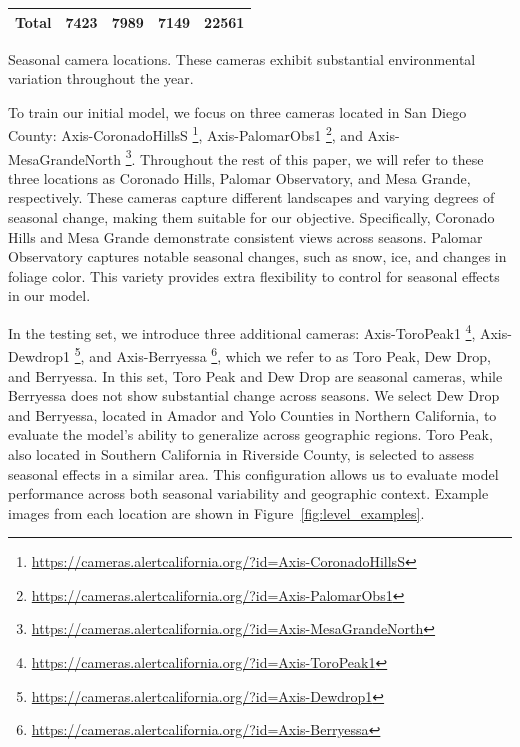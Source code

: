 \documentclass[remotesensing,article,submit,moreauthors]{Definitions/mdpi}
\begin{document}
\begin{table}[H]
\begin{threeparttable}
\begin{tabular}{@{}lrrrr@{}}
\midrule
\textbf{Total} & 7423 & 7989 & 7149 & 22561 \\
\bottomrule
\end{tabular}

\begin{tablenotes}
\footnotesize
\item[*]Seasonal camera locations. These cameras exhibit substantial environmental variation throughout the year.
\end{tablenotes}

\end{threeparttable}
\end{table}


To train our initial model, we focus on three cameras located in San Diego County: Axis-CoronadoHillsS \footnote{\url{https://cameras.alertcalifornia.org/?id=Axis-CoronadoHillsS}}, Axis-PalomarObs1 \footnote{\url{https://cameras.alertcalifornia.org/?id=Axis-PalomarObs1}}, and Axis-MesaGrandeNorth \footnote{\url{https://cameras.alertcalifornia.org/?id=Axis-MesaGrandeNorth}}. Throughout the rest of this paper, we will refer to these three locations as Coronado Hills, Palomar Observatory, and Mesa Grande, respectively. These cameras capture different landscapes and varying degrees of seasonal change, making them suitable for our objective. Specifically, Coronado Hills and Mesa Grande demonstrate consistent views across seasons. Palomar Observatory captures notable seasonal changes, such as snow, ice, and changes in foliage color. This variety provides extra flexibility to control for seasonal effects in our model. 

In the testing set, we introduce three additional cameras: Axis-ToroPeak1 \footnote{\url{https://cameras.alertcalifornia.org/?id=Axis-ToroPeak1}}, Axis-Dewdrop1 \footnote{\url{https://cameras.alertcalifornia.org/?id=Axis-Dewdrop1}}, and Axis-Berryessa \footnote{\url{https://cameras.alertcalifornia.org/?id=Axis-Berryessa}}, which we refer to as Toro Peak, Dew Drop, and Berryessa. In this set, Toro Peak and Dew Drop are seasonal cameras, while Berryessa does not show substantial change across seasons. We select Dew Drop and Berryessa, located in Amador and Yolo Counties in Northern California, to evaluate the model's ability to generalize across geographic regions. Toro Peak, also located in Southern California in Riverside County, is selected to assess seasonal effects in a similar area. This configuration allows us to evaluate model performance across both seasonal variability and geographic context. Example images from each location are shown in Figure~\ref{fig:level_examples}. 
\end{document}
